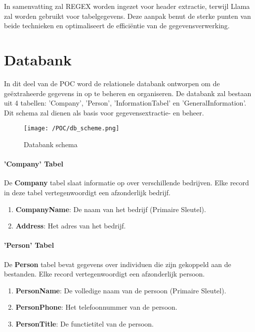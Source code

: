 In samenvatting zal REGEX worden ingezet voor header extractie, terwijl Llama zal worden gebruikt voor tabelgegevens. Deze aanpak benut de sterke punten van beide technieken en optimaliseert de efficiëntie van de gegevensverwerking.

\section{Databank}
In dit deel van de POC word de relationele databank ontworpen om de geëxtraheerde gegevens in op te beheren en organiseren. De databank zal bestaan uit 4 tabellen: 'Company', 'Person', 'InformationTabel' en 'GeneralInformation'. Dit schema zal dienen als basis voor gegevensextractie- en beheer.

\begin{figure}[H]
    \centering        
    \texttt{[image: /POC/db\_scheme.png]}
    \caption{Databank schema}
    \label{fig:databank_schema}
\end{figure}
\paragraph{'Company' Tabel}

De \textbf{Company} tabel slaat informatie op over verschillende bedrijven. Elke record in deze tabel vertegenwoordigt een afzonderlijk bedrijf.

\begin{enumerate}
    \item \textbf{CompanyName}: De naam van het bedrijf (Primaire Sleutel).
    \item \textbf{Address}: Het adres van het bedrijf.
\end{enumerate}

\paragraph{'Person' Tabel}

De \textbf{Person} tabel bevat gegevens over individuen die zijn gekoppeld aan de bestanden. Elke record vertegenwoordigt een afzonderlijk persoon.

\begin{enumerate}
    \item \textbf{PersonName}: De volledige naam van de persoon (Primaire Sleutel).
    \item \textbf{PersonPhone}: Het telefoonnummer van de persoon.
    \item \textbf{PersonTitle}: De functietitel van de persoon.
\end{enumerate}

